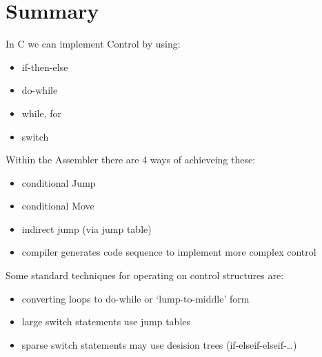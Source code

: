 \documentclass[12pt]{book}
\begin{document}
\section*{Summary}
In C we can implement Control by using:
\begin{itemize}
        \item if-then-else
        \item do-while
        \item while, for
        \item switch
\end{itemize}

Within the Assembler there are 4 ways of achieveing these:
\begin{itemize}
        \item conditional Jump
        \item conditional Move
        \item indirect jump (via jump table)
        \item compiler generates code sequence to implement more complex control
\end{itemize}

Some standard techniques for operating on control structures are:
\begin{itemize}
        \item converting loops to do-while or `lump-to-middle' form
        \item large switch statements use jump tables
        \item sparse switch statements may use desision trees (if-elseif-elseif-\ldots)
\end{itemize}
\end{document}
